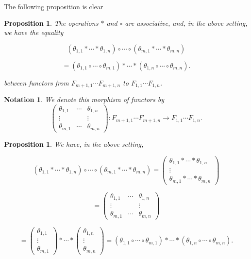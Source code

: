 \documentclass[12pt]{article}%
\newtheorem{prop}[thm]{Proposition}
\newtheorem{nota}[thm]{Notation}
\theoremstyle{remark}
\theoremstyle{definition}
\newcommand{\nn}{\noindent}
\begin{document}
The following proposition is clear 

\begin{prop}
The operations $*$ and $\circ$ are associative, and, in the above setting, we have the equality 

$$
(\theta_{1,1}*\cdots*\theta_{1,n})\circ\cdots\circ(\theta_{m,1}*\cdots*\theta_{m,n})
$$ 

$$
=(\theta_{1,1}\circ\cdots\circ\theta_{m,1})*\cdots*(\theta_{1,n}\circ\cdots\circ\theta_{m,n}).
$$

\nn between functors from $F_{m+1,1}\cdots F_{m+1,n}$ to $F_{1,1}\cdots F_{1,n}$.
\end{prop}

\begin{nota}\label{nmat} 
We denote this morphism of functors by
$$
\begin{pmatrix}
\theta_{1,1}&\cdots&\theta_{1,n}\\
\vdots&&\vdots\\ 
\theta_{m,1}&\cdots&\theta_{m,n}
\end{pmatrix}:F_{m+1,1}\cdots F_{m+1,n}\to F_{1,1}\cdots F_{1,n}.
$$ 
\end{nota}

\begin{prop}\label{pil1}
We have, in the above setting,

$$
(\theta_{1,1}*\cdots*\theta_{1,n})\circ\cdots\circ(\theta_{m,1}*\cdots*\theta_{m,n})
=\begin{pmatrix}
\theta_{1,1}*\cdots*\theta_{1,n}\\
\vdots\\ 
\theta_{m,1}*\cdots*\theta_{m,n}
\end{pmatrix}
$$ 

$$
=\begin{pmatrix}
\theta_{1,1}&\cdots&\theta_{1,n}\\
\vdots&&\vdots\\ 
\theta_{m,1}&\cdots&\theta_{m,n}
\end{pmatrix}
$$

$$
=\begin{pmatrix}\theta_{1,1}\\ \vdots\\ \theta_{m,1}\end{pmatrix}*\cdots*
\begin{pmatrix}\theta_{1,n}\\ \vdots\\ \theta_{m,n}\end{pmatrix}
=(\theta_{1,1}\circ\cdots\circ\theta_{m,1})*\cdots*(\theta_{1,n}\circ\cdots\circ\theta_{m,n}).
$$
\end{prop}
\end{document}
